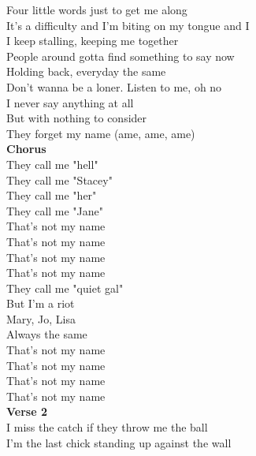 Four little words just to get me along \\
It's a difficulty and I'm biting on my tongue and I\\
I keep stalling, keeping me together \\
People around gotta find something to say now \\
Holding back, everyday the same \\
Don't wanna be a loner. Listen to me, oh no \\
I never say anything at all \\
But with nothing to consider\\
They forget my name (ame, ame, ame) \\
\textbf{Chorus}\\
They call me "hell" \\
They call me "Stacey" \\
They call me "her" \\
They call me "Jane" \\
That's not my name\\
That's not my name \\
That's not my name\\
That's not my name \\
They call me "quiet gal"\\
But I'm a riot \\
Mary, Jo, Lisa \\
Always the same \\
That's not my name \\
That's not my name \\
That's not my name \\
That's not my name \\
\textbf{Verse 2}\\
I miss the catch if they throw me the ball \\
I'm the last chick standing up against the wall \\

